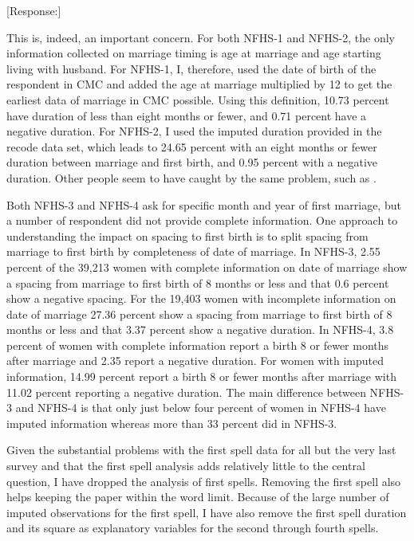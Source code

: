 \documentclass[letterpaper,12pt]{article}
\begin{document}
[Response:]

This is, indeed, an important concern.
For both NFHS-1 and NFHS-2, the only information collected on marriage timing is age at 
marriage and age starting living with husband.
For NFHS-1, I, therefore, used the date of birth of the respondent in CMC and added the 
age at marriage multiplied by 12 to get the earliest data of marriage in CMC possible.
Using this definition, 10.73 percent have duration of less than eight months or fewer, and
0.71 percent have a negative duration.
For NFHS-2, I used the imputed duration provided in the recode data set, which leads to 
24.65 percent with an eight months or fewer duration between marriage and first birth, 
and 0.95 percent with a negative duration.
Other people seem to have caught by the same problem, such as \citet{Padmadas2004}.

Both NFHS-3 and NFHS-4 ask for specific month and year of first marriage, but a number of
respondent did not provide complete information.
One approach to understanding the impact on spacing to first birth is to split spacing 
from marriage to first birth by completeness of date of marriage.
In NFHS-3, 2.55 percent of the 39,213 women with complete information on date of 
marriage show a spacing from marriage to first birth of 8 months or less and that 0.6 
percent show a negative spacing. 
For the 19,403 women with incomplete information on date of marriage 27.36 percent show
a spacing from marriage to first birth of 8 months or less and that 3.37 percent show a 
negative duration.
In NFHS-4, 3.8 percent of women with complete information report a birth 8 or fewer months
after marriage and 2.35 report a negative duration.
For women with imputed information, 14.99 percent report a birth 8 or fewer months
after marriage with 11.02 percent reporting a negative duration.
The main difference between NFHS-3 and NFHS-4 is that only just below four percent of 
women in NFHS-4 have imputed information whereas more than 33 percent did in NFHS-3.

Given the substantial problems with the first spell data for all but the very last
survey and that the first spell analysis adds relatively little to the central question, 
I have dropped the analysis of first spells.
Removing the first spell also helps keeping the paper within the word limit.
Because of the large number of imputed observations for the first spell, I have also
remove the first spell duration and its square as explanatory variables for the second
through fourth spells.
\end{document}
